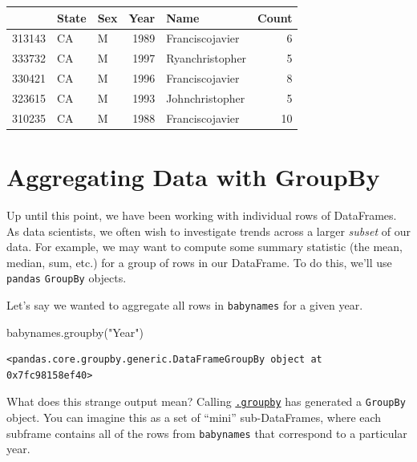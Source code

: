 \documentclass[
  letterpaper,
  DIV=11,
  numbers=noendperiod]{scrreprt}
\newenvironment{Shaded}{\begin{snugshade}}{\end{snugshade}}
\newcommand{\NormalTok}[1]{\textcolor[rgb]{0.00,0.23,0.31}{#1}}
\newcommand{\StringTok}[1]{\textcolor[rgb]{0.13,0.47,0.30}{#1}}
\begin{document}
\begin{tabular}{lllrlr}
\toprule
{} & State & Sex &  Year &             Name &  Count \\
\midrule
313143 &    CA &   M &  1989 &  Franciscojavier &      6 \\
333732 &    CA &   M &  1997 &  Ryanchristopher &      5 \\
330421 &    CA &   M &  1996 &  Franciscojavier &      8 \\
323615 &    CA &   M &  1993 &  Johnchristopher &      5 \\
310235 &    CA &   M &  1988 &  Franciscojavier &     10 \\
\bottomrule
\end{tabular}

\hypertarget{aggregating-data-with-groupby}{%
\section{Aggregating Data with
GroupBy}\label{aggregating-data-with-groupby}}

Up until this point, we have been working with individual rows of
DataFrames. As data scientists, we often wish to investigate trends
across a larger \emph{subset} of our data. For example, we may want to
compute some summary statistic (the mean, median, sum, etc.) for a group
of rows in our DataFrame. To do this, we'll use \texttt{pandas}
\texttt{GroupBy} objects.

Let's say we wanted to aggregate all rows in \texttt{babynames} for a
given year.

\begin{Shaded}
\begin{Highlighting}[]
\NormalTok{babynames.groupby(}\StringTok{"Year"}\NormalTok{)}
\end{Highlighting}
\end{Shaded}

\begin{verbatim}
<pandas.core.groupby.generic.DataFrameGroupBy object at 0x7fc98158ef40>
\end{verbatim}

What does this strange output mean? Calling
\href{https://pandas.pydata.org/pandas-docs/stable/reference/api/pandas.DataFrame.groupby.html}{\texttt{.groupby}}
has generated a \texttt{GroupBy} object. You can imagine this as a set
of ``mini'' sub-DataFrames, where each subframe contains all of the rows
from \texttt{babynames} that correspond to a particular year.
\end{document}
